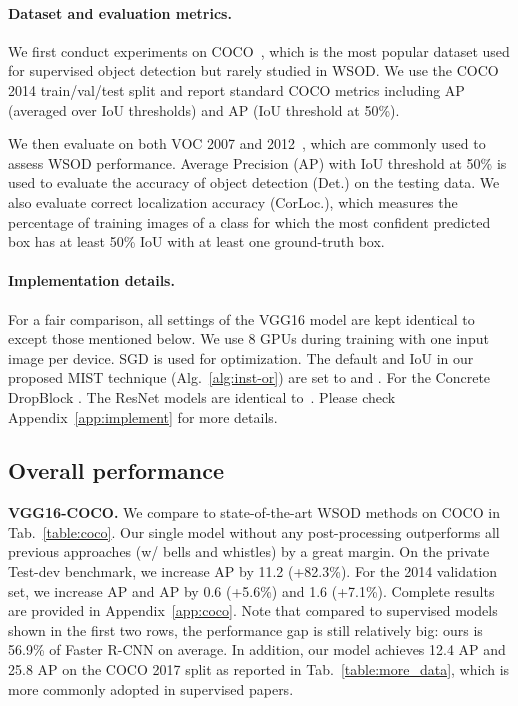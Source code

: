 \documentclass[10pt,twocolumn,letterpaper]{article}
\begin{document}
\vspace{-1em}
\paragraph{\textbf{Dataset and evaluation metrics.} }
We first conduct experiments on COCO~\cite{coco}, which is the most popular dataset used for supervised object detection but rarely studied in WSOD. We use the COCO 2014 train/val/test split and report standard COCO metrics including AP (averaged over IoU thresholds) and AP (IoU threshold at 50\%).  

We then evaluate on both VOC 2007 and 2012~\cite{pascal}, which are commonly used to assess WSOD performance. Average Precision (AP) with IoU threshold at 50\% is used to evaluate the accuracy of object detection (Det.) on the testing data. We also evaluate correct localization accuracy (CorLoc.), which measures the percentage of training images of a class for which the most confident predicted box has at least 50\% IoU with at least one ground-truth box.

\vspace{-1em}
\paragraph{\textbf{Implementation details.} }
For a fair comparison, all  settings of the VGG16 model are kept identical to~\cite{tang2017multiple, tang2018pcl} except those mentioned below. We use 8 GPUs during training with one input image per device. SGD is used for optimization. The default  and IoU in our proposed MIST technique (Alg.~\ref{alg:inst-or}) are set to  and . For the Concrete DropBlock . The ResNet models are  identical to~\cite{fastrcnn}. Please check Appendix~\ref{app:implement} for more  details.

\subsection{Overall performance}

\noindent\textbf{VGG16-COCO.}
We compare to state-of-the-art WSOD methods on COCO in Tab.~\ref{table:coco}. Our single model without any post-processing outperforms all previous approaches (w/ bells and whistles) by a great margin. On the private Test-dev benchmark, we increase  AP by 11.2 (+82.3\%). For the 2014 validation set, we increase  AP and AP by 0.6 (+5.6\%) and 1.6 (+7.1\%). Complete results are provided in Appendix~\ref{app:coco}.  Note that compared to  supervised models  shown in the first two rows, the performance gap is still relatively big: ours is 56.9\% of Faster R-CNN on average. In addition, our model achieves 12.4 AP and 25.8 AP on the COCO 2017 split as reported in Tab.~\ref{table:more_data}, which is more commonly adopted in supervised papers. 
\end{document}

